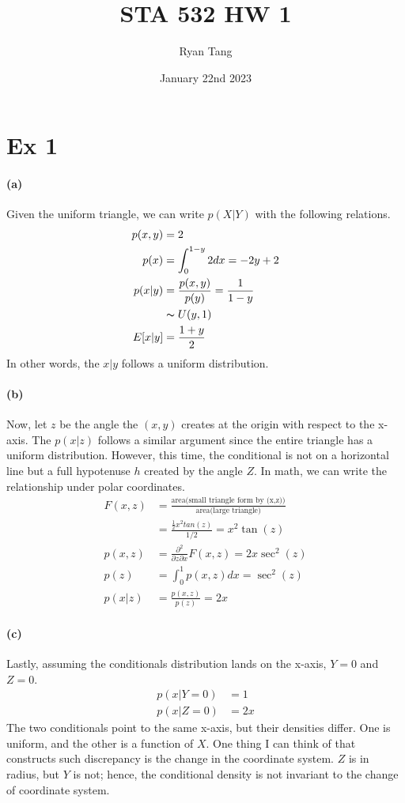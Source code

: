 \documentclass[11pt, letterpaper]{article}
\author{Ryan Tang}
\title{STA 532 HW 1}
\date{January 22nd 2023}
\begin{document}
\maketitle

\section{Ex 1}
\paragraph{(a)}
Given the uniform triangle, we can write $p(X|Y)$ with the following relations.
\begin{align*}
    p(x, y) &= 2 \\
    p(x) &= \int_0^{1-y} 2 dx = -2y + 2 \\
    p(x|y) &= \frac{p(x, y)}{p(y)} = \frac{1}{1-y} \\
           &\thicksim U(y, 1) \\
    E[x|y] &= \frac{1+y}{2}
\end{align*}
In other words, the $x|y$ follows a uniform distribution.

\paragraph{(b)}
Now, let $z$ be the angle the $(x, y)$ creates at the origin with respect to the x-axis. The $p(x|z)$ follows a similar argument since the entire triangle has a uniform distribution. However, this time, the conditional is not on a horizontal line but a full hypotenuse $h$ created by the angle $Z$. In math, we can write the relationship under polar coordinates.
\begin{align*}
    F(x, z) &= \frac{\text{area(small triangle form by (x,z))}}{\text{area(large triangle)}} \\
        &= \frac{\frac{1}{2}x^2 tan(z)}{1/2} = x^2 \tan(z) \\
    p(x, z) &= \frac{\partial^2}{\partial z \partial x} F(x, z) = 2x \sec^2(z) \\
    p(z) &= \int_0^1 p(x, z) dx = \sec^2(z) \\
    p(x|z) &= \frac{p(x, z)}{p(z)} = 2x
\end{align*}

\paragraph{(c)}
Lastly, assuming the conditionals distribution lands on the x-axis, $Y=0$ and $Z=0$.
\begin{align*}
    p(x|Y=0) &= 1 \\
    p(x|Z=0) &= 2x
\end{align*}
The two conditionals point to the same x-axis, but their densities differ. One is uniform, and the other is a function of $X$. One thing I can think of that constructs such discrepancy is the change in the coordinate system. $Z$ is in radius, but $Y$ is not; hence, the conditional density is not invariant to the change of coordinate system.
\end{document}
